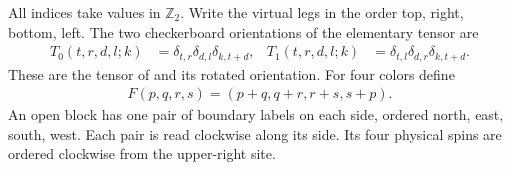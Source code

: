 \begin{definition}%
    \label{def:peps_kitaev_checkerboard_tensor}
    \leanok
    All indices take values in $\mathbb Z_2$. Write the virtual legs in the
    order top, right, bottom, left. The two checkerboard orientations of the
    elementary tensor are
    \begin{align}
        T_0(t,r,d,l;k) & =\delta_{t,r}\delta_{d,l}\delta_{k,t+d}, &
        T_1(t,r,d,l;k) & =\delta_{t,l}\delta_{d,r}\delta_{k,t+d}.
    \end{align}
    These are the tensor of
    \cite[Section~7, ``Kitaev's code state'']{Schuch2010PEPS}
    and its rotated orientation. For four colors define
    \begin{align}
        F(p,q,r,s)=(p+q,q+r,r+s,s+p).
    \end{align}
    An open block has one pair of boundary labels on each side, ordered
    north, east, south, west. Each pair is read clockwise along its side.
    Its four physical spins are ordered clockwise from the upper-right site.
\end{definition}

